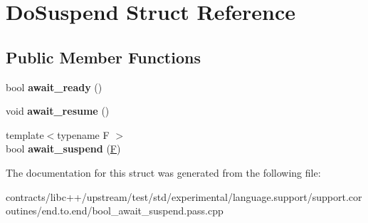 \hypertarget{struct_do_suspend}{}\section{Do\+Suspend Struct Reference}
\label{struct_do_suspend}
\subsection*{Public Member Functions}
\begin{DoxyCompactItemize}
\item 
\mbox{\label{struct_do_suspend_a94762417485392c3e1f83debd7d0cf16}} 
bool {\bfseries await\+\_\+ready} ()
\item 
\mbox{\label{struct_do_suspend_ad004ef2aaf3c43e9619570be438b4b19}} 
void {\bfseries await\+\_\+resume} ()
\item 
\mbox{\label{struct_do_suspend_a22b6fec0c6600cc96ca1461b8a75a23b}} 
{\footnotesize template$<$typename F $>$ }\\bool {\bfseries await\+\_\+suspend} (\mbox{\hyperlink{struct_f}{F}})
\end{DoxyCompactItemize}


The documentation for this struct was generated from the following file\+:\begin{DoxyCompactItemize}
\item 
contracts/libc++/upstream/test/std/experimental/language.\+support/support.\+coroutines/end.\+to.\+end/bool\+\_\+await\+\_\+suspend.\+pass.\+cpp\end{DoxyCompactItemize}
